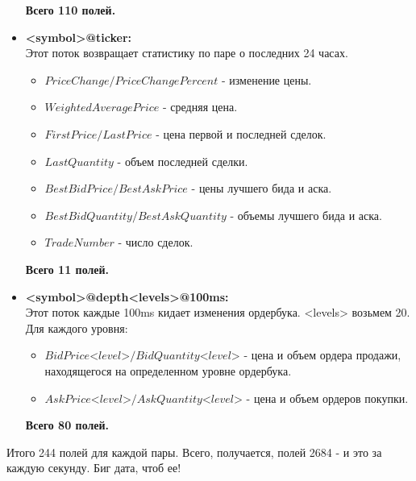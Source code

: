 \documentclass[a4paper,12pt]{article}
\begin{document}
\begin{itemize}
	\textbf{Всего 110 полей.}
	\item \textbf{<symbol>@ticker:}\\
	Этот поток возвращает статистику по паре о последних 24 часах.
	\begin{itemize}
		\item $PriceChange/PriceChangePercent$ - изменение цены.
		\item $WeightedAveragePrice$ - средняя цена.
		\item $FirstPrice/LastPrice$ - цена первой и последней сделок. 
		\item $LastQuantity$ - объем последней сделки.
		\item $BestBidPrice/BestAskPrice$ - цены лучшего бида и аска.
		\item $BestBidQuantity/BestAskQuantity$ - объемы лучшего бида и аска.
		\item $TradeNumber$ - число сделок.
	\end{itemize}
	\textbf{Всего 11 полей.}
	\item \textbf{<symbol>@depth<levels>@100ms:}\\
	Этот поток каждые 100ms кидает изменения ордербука. <levels> возьмем 20. Для каждого уровня:
	\begin{itemize}
		\item $BidPrice\text{<}level\text{>}/BidQuantity\text{<}level\text{>}$ - цена и объем ордера продажи, находящегося на определенном уровне ордербука.
		\item $AskPrice\text{<}level\text{>}/AskQuantity\text{<}level\text{>}$ - цена и объем ордеров покупки.
	\end{itemize}
	\textbf{Всего 80 полей.}
\end{itemize}

Итого 244 полей для каждой пары. Всего, получается, полей 2684 - и это за каждую секунду. Биг дата, чтоб ее!
\end{document}
